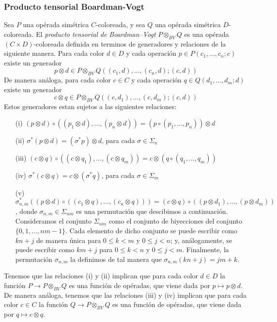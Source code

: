 \documentclass[../main.tex]{subfiles}
\begin{document}
\subsubsection{Producto tensorial Boardman-Vogt}
\begin{defi}
    Sea $P$ una op\'erada sim\'etrica $C$-coloreada, y sea $Q$ una op\'erada sim\'etrica $D$-coloreada. El \emph{producto tensorial de Boardman--Vogt} $P\otimes_{BV}Q$ es una op\'erada $(C\times D)$-coloreada definida en terminos de generadores y relaciones de la siguiente manera.
    Para cada color $d\in D$ y cada operaci\'on $p\in P(c_1,\dots,c_n;c)$ existe un generador
    $$
        p \otimes d \in P\otimes_{BV}Q((c_1,d),\dots,(c_n,d);(c,d))
    $$
    De manera an\'aloga, para cada color $c\in C$ y cada operaci\'on $q\in Q(d_1,\dots,d_m;d)$ existe un generador
    $$
        c \otimes q \in P\otimes_{BV}Q((c,d_1),\dots,(c,d_m);(c,d))
    $$
    Estos generadores estan sujetos a las siguientes relaciones:
    \begin{enumerate}
        \item[{\rm (i)}] $(p\otimes d) \circ ((p_1\otimes d),\dots,(p_n\otimes d)) = (p\circ(p_1,\dots,p_n))\otimes d$
        \item[{\rm (ii)}] $\sigma^{*}(p\otimes d) = (\sigma^{*}p)\otimes d$, para cada $\sigma\in\Sigma_n$
        \item[{\rm (iii)}] $(c\otimes q) \circ ((c\otimes q_1),\dots,(c\otimes q_m)) = c\otimes (q\circ(q_1,\dots,q_m))$
        \item[{\rm (iv)}] $\sigma^{*}(c\otimes q) = c\otimes (\sigma^{*}q)$, para cada $\sigma\in\Sigma_m$
        \item[{\rm (v)}] $\sigma_{n,m}^{*}((p\otimes d)\circ((c_1\otimes q),\dots,(c_n\otimes q))) = (c\otimes q)\circ((p\otimes d_1),\dots,(p\otimes d_m))$, donde $\sigma_{n,m}\in\Sigma_{nm}$ es una permutaci\'on que descibimos a continuaci\'on.
              Consideramos el conjunto $\Sigma_{nm}$ como el conjunto de biyecciones del conjunto $\{0,1,\dots,nm-1\}$. Cada elemento de dicho conjunto se puede escribir como $kn+j$ de manera \'unica para $0\le k<m$ y $0\le j<n$; y, an\'alogamente, se puede escribir como $km+j$ para $0\le k<n$ y $0\le j<m$.
              Finalmente, la permutaci\'on $\sigma_{n,m}$ la definimos de tal manera que $\sigma_{n,m}(kn+j) = jm+k$.
    \end{enumerate}
\end{defi}
\begin{obs}
    Tenemos que las relaciones (i) y (ii) implican que para cada color $d\in D$ la funci\'on $P\to P\otimes_{BV}Q$ es una funci\'on de op\'eradas, que viene dada por $p\mapsto p\otimes d$. De manera an\'aloga, tenemos que las relaciones (iii) y (iv) implican que para cada color $c\in C$ la funci\'on $Q\to P\otimes_{BV}Q$ es una funci\'on de op\'eradas, que viene dada por $q\mapsto c\otimes q$.
\end{obs}
\end{document}
